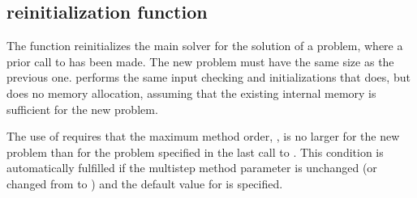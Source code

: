 \subsection{{\cvodes} reinitialization function}\label{sss:cvreinit}

The function  reinitializes the main {\cvodes} solver for
the solution of a problem, where a prior call to  has
been made. The new problem must have the same size as the previous one.
 performs the same input checking and initializations 
that  does, but does no memory allocation, assuming that the 
existing internal memory is sufficient for the new problem.             
                                                                 
The use of  requires that the maximum method order,    
, is no larger for the new problem than for the problem  
specified in the last call to .  This condition is  
automatically fulfilled if the multistep method parameter   
is unchanged (or changed from  to ) and the default    
value for  is specified.

